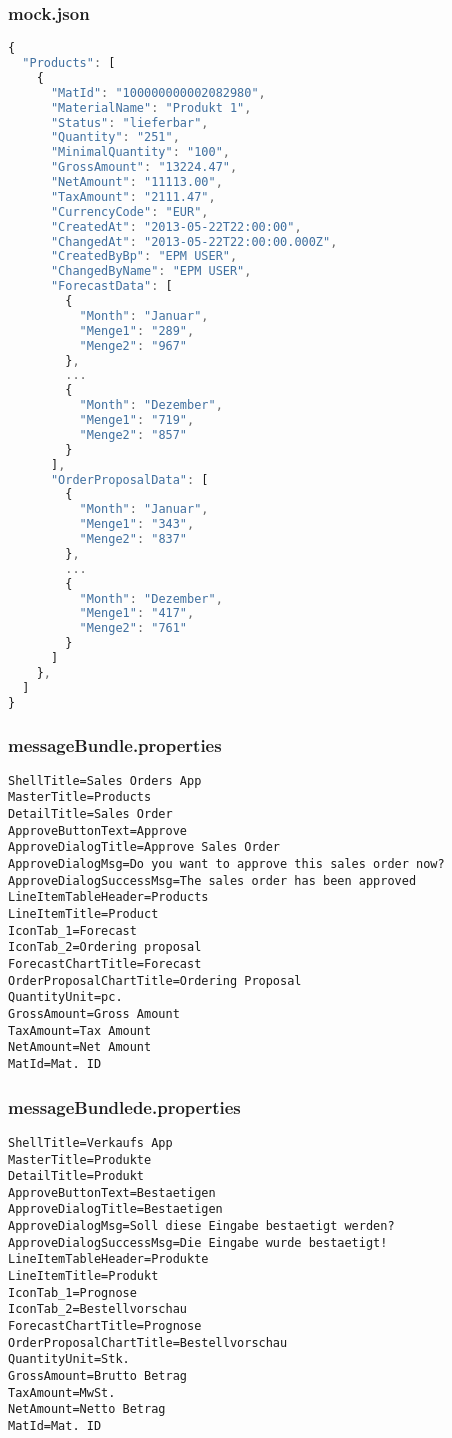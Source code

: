 \newpage
\subsubsection*{mock.json}
\begin{lstlisting}[language=JavaScript, label=lst:mock.json]
{
  "Products": [
    {
      "MatId": "100000000002082980",
      "MaterialName": "Produkt 1",
      "Status": "lieferbar",
      "Quantity": "251",
      "MinimalQuantity": "100",
      "GrossAmount": "13224.47",
      "NetAmount": "11113.00",
      "TaxAmount": "2111.47",
      "CurrencyCode": "EUR",
      "CreatedAt": "2013-05-22T22:00:00",
      "ChangedAt": "2013-05-22T22:00:00.000Z",
      "CreatedByBp": "EPM USER",
      "ChangedByName": "EPM USER",
      "ForecastData": [
        {
          "Month": "Januar",
          "Menge1": "289",
          "Menge2": "967"
        },
        ...
        {
          "Month": "Dezember",
          "Menge1": "719",
          "Menge2": "857"
        }
      ],
      "OrderProposalData": [
        {
          "Month": "Januar",
          "Menge1": "343",
          "Menge2": "837"
        },
        ...
        {
          "Month": "Dezember",
          "Menge1": "417",
          "Menge2": "761"
        }
      ]
    },
  ]
}
\end{lstlisting}

\newpage
\subsubsection*{messageBundle.properties}
\begin{lstlisting}[language=HTML5, label=lst:messageBundle.properties]
ShellTitle=Sales Orders App
MasterTitle=Products
DetailTitle=Sales Order
ApproveButtonText=Approve
ApproveDialogTitle=Approve Sales Order
ApproveDialogMsg=Do you want to approve this sales order now?
ApproveDialogSuccessMsg=The sales order has been approved
LineItemTableHeader=Products
LineItemTitle=Product
IconTab_1=Forecast
IconTab_2=Ordering proposal
ForecastChartTitle=Forecast
OrderProposalChartTitle=Ordering Proposal
QuantityUnit=pc.
GrossAmount=Gross Amount
TaxAmount=Tax Amount
NetAmount=Net Amount
MatId=Mat. ID
\end{lstlisting}

\subsubsection*{messageBundle\textunderscore de.properties}
\begin{lstlisting}[language=HTML5, label=lst:messageBundleDE.properties]
ShellTitle=Verkaufs App
MasterTitle=Produkte
DetailTitle=Produkt
ApproveButtonText=Bestaetigen
ApproveDialogTitle=Bestaetigen
ApproveDialogMsg=Soll diese Eingabe bestaetigt werden?
ApproveDialogSuccessMsg=Die Eingabe wurde bestaetigt!
LineItemTableHeader=Produkte
LineItemTitle=Produkt
IconTab_1=Prognose
IconTab_2=Bestellvorschau
ForecastChartTitle=Prognose
OrderProposalChartTitle=Bestellvorschau
QuantityUnit=Stk.
GrossAmount=Brutto Betrag
TaxAmount=MwSt.
NetAmount=Netto Betrag
MatId=Mat. ID

\end{lstlisting}
